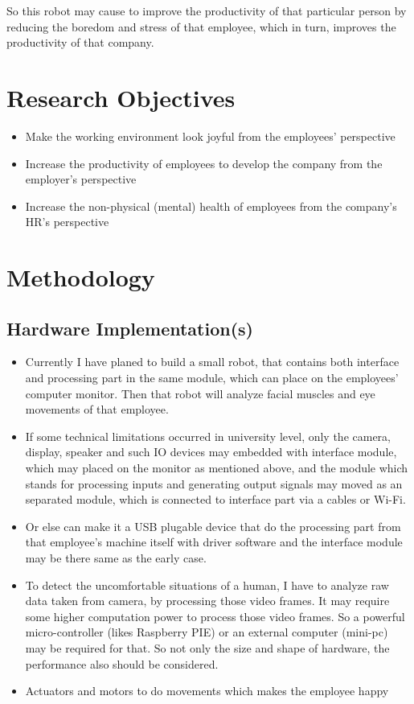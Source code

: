 \documentclass{article}
\begin{document}
	\indent So this robot may cause to improve the productivity of that particular person by reducing the boredom and stress of that employee, which in turn, improves the productivity of that company.
	
	\section{Research Objectives}
	\begin{itemize}
		\item Make the working environment look joyful from the employees’ perspective
		\item Increase the productivity of employees to develop the company from the employer’s perspective
		\item Increase the non-physical (mental) health of employees from the company's HR’s perspective
	\end{itemize}

	\section{Methodology}
	\subsection{Hardware Implementation(s)}
	\begin{itemize}
		\item Currently I have planed to build a small robot, that contains both interface and processing part in the same module, which can place on the employees' computer monitor. Then that robot will analyze facial muscles and eye movements of that employee.
		\item If some technical limitations occurred in university level, only the camera, display, speaker and such IO devices may embedded with interface module, which may placed on the monitor as mentioned above, and the module which stands for processing inputs and generating output signals may moved as an separated module, which is connected to interface part via a cables or Wi-Fi.
		\item Or else can make it a USB plugable device that do the processing part from that employee's machine itself with driver software and the interface module may be there same as the early case.
		\item To detect the uncomfortable situations of a human, I have to analyze raw data taken from camera, by processing those video frames. It may require some higher computation power to process those video frames. So a powerful micro-controller (likes Raspberry PIE) or an external computer (mini-pc) may be required for that. So not only the size and shape of hardware, the performance also should be considered.
		\item Actuators and motors to do movements which makes the employee happy
	\end{itemize}
\end{document}

